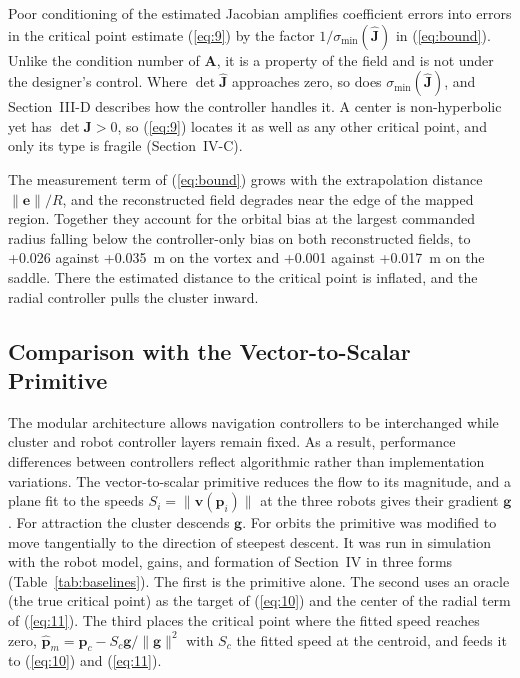\documentclass[lettersize,journal]{IEEEtran}
\newcommand{\rev}[1]{#1}                             %
\begin{document}
Poor conditioning of the estimated Jacobian amplifies coefficient errors into errors in the critical point estimate (\ref{eq:9}) by the factor $1/\sigma_{\min}(\hat{\mathbf{J}})$ in (\ref{eq:bound}). Unlike the condition number of $\mathbf{A}$, it is a property of the field and is not under the designer's control. Where $\det\hat{\mathbf{J}}$ approaches zero, so does $\sigma_{\min}(\hat{\mathbf{J}})$, and Section~III-D describes how the controller handles it. A center is non-hyperbolic yet has $\det\mathbf{J} > 0$, so (\ref{eq:9}) locates it as well as any other critical point, and only its type is fragile (Section~IV-C).

The measurement term of (\ref{eq:bound}) grows with the extrapolation distance $\|\mathbf{e}\|/R$, and the reconstructed field degrades near the edge of the mapped region. Together they account for the orbital bias at the largest commanded radius falling below the controller-only bias on both reconstructed fields, to \rev{+0.026} against \rev{+0.035}~m on the vortex and \rev{+0.001} against \rev{+0.017}~m on the saddle. There the estimated distance to the critical point is inflated, and the radial controller pulls the cluster inward. %

\subsection{Comparison with the Vector-to-Scalar Primitive}

The modular architecture allows navigation controllers to be interchanged while cluster and robot controller layers remain fixed. As a result, performance differences between controllers reflect algorithmic rather than implementation variations. %
The vector-to-scalar primitive \cite{48} reduces the flow to its magnitude, and a plane fit to the speeds $S_i = \|\mathbf{v}(\mathbf{p}_i)\|$ at the three robots gives their gradient $\mathbf{g}$. For attraction the cluster descends $\mathbf{g}$. For orbits the primitive was modified to move tangentially to the direction of steepest descent. It was run in simulation with the robot model, gains, and formation of Section~IV in three forms (Table~\ref{tab:baselines}). The first is the primitive alone. The second uses an oracle (the true critical point) as the target of (\ref{eq:10}) and the center of the radial term of (\ref{eq:11}). The third places the critical point where the fitted speed reaches zero, $\hat{\mathbf{p}}_m = \mathbf{p}_c - S_c\mathbf{g}/\|\mathbf{g}\|^2$ with $S_c$ the fitted speed at the centroid, and feeds it to (\ref{eq:10}) and (\ref{eq:11}).
\end{document}
